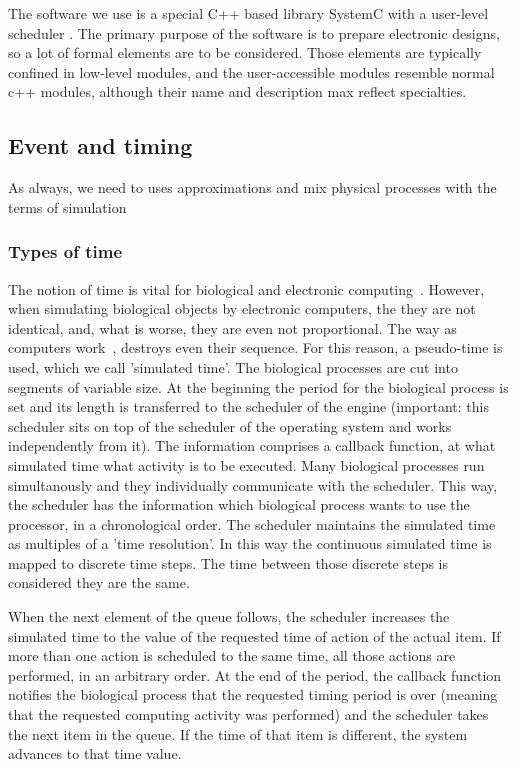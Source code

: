 The software we use is a special C++ based library SystemC with a user-level scheduler
\cite{SystemChome:2017,SystemCBook:2010}. The primary purpose of the software
is to prepare electronic designs, so a lot of formal elements are to be considered.
Those elements are typically confined in low-level modules, and the user-accessible modules
resemble normal c++ modules, although their name and description max reflect specialties.

\subsection{Event and timing\label{sec:Simulation-EventTiming}}

As always, we need to uses approximations
and mix physical processes with the terms of simulation


\subsubsection{Types of time\label{sec:Simulation-time }}
The notion of time is vital for biological and electronic
computing~\cite{RoleOfInformationTransferSpeed:2022,VeghIntroducingTemporalBehaviorScience:2020}. However,
when simulating biological objects by electronic computers,
the they are not identical, and, what is worse, they are even not proportional. The way as computers work~\cite{VeghMissingSecondDraft:2020}, destroys even their sequence. For this reason, a pseudo-time is used, which we call 
'simulated time'. 
The biological processes are cut into segments of variable size.
At the beginning the period for the biological process is set and
its length is transferred to the scheduler of the engine (important: this scheduler sits on top of the scheduler of the 
operating system and works independently from it).
The information comprises a callback function, at what simulated
time what activity is to be executed.
Many biological processes run simultanously and they individually 
communicate with the scheduler.
This way, the scheduler has the information which biological process wants to use the processor, in a chronological order. 
The scheduler maintains the simulated time as multiples of
a 'time resolution'. In this way the continuous simulated time
is mapped to discrete time steps. The time between those
discrete steps is considered they are the same.

When the next element of the queue follows, the scheduler
increases the simulated time to the value of the requested time of action of the actual item. If more than one action is scheduled to the same time, all those actions are performed, in an arbitrary order. At the end of the period, the callback function
notifies the biological process that the requested timing period
is over (meaning that the requested computing activity was performed) and the scheduler takes the next item in the queue.
If the time of that item is different, the system advances to
that time value.

